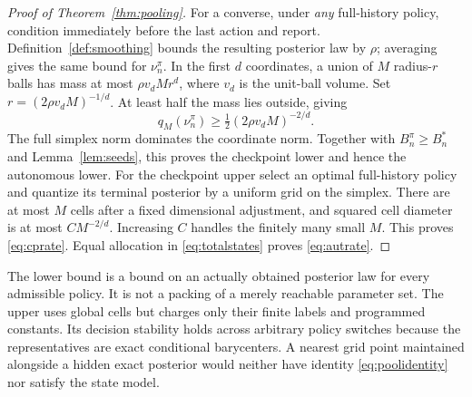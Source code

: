 \begin{proof}[Proof of Theorem~\ref{thm:pooling}]
For a converse, under \emph{any} full-history policy, condition immediately before the last action and report. Definition~\ref{def:smoothing} bounds the resulting posterior law by $\rho$; averaging gives the same bound for $\nu_n^\pi$. In the first $d$ coordinates, a union of $M$ radius-$r$ balls has mass at most $\rho v_dMr^d$, where $v_d$ is the unit-ball volume. Set $r=(2\rho v_dM)^{-1/d}$. At least half the mass lies outside, giving
\begin{equation}\label{eq:smallballlower}
 q_M(\nu_n^\pi)\ge\tfrac12(2\rho v_dM)^{-2/d}.
\end{equation}
The full simplex norm dominates the coordinate norm. Together with $B_n^\pi\ge B_n^*$ and Lemma~\ref{lem:seeds}, this proves the checkpoint lower and hence the autonomous lower. For the checkpoint upper select an optimal full-history policy and quantize its terminal posterior by a uniform grid on the simplex. There are at most $M$ cells after a fixed dimensional adjustment, and squared cell diameter is at most $CM^{-2/d}$. Increasing $C$ handles the finitely many small $M$. This proves \eqref{eq:cprate}. Equal allocation in \eqref{eq:totalstates} proves \eqref{eq:autrate}.
\end{proof}

The lower bound is a bound on an actually obtained posterior law for every admissible policy. It is not a packing of a merely reachable parameter set. The upper uses global cells but charges only their finite labels and programmed constants. Its decision stability holds across arbitrary policy switches because the representatives are exact conditional barycenters. A nearest grid point maintained alongside a hidden exact posterior would neither have identity \eqref{eq:poolidentity} nor satisfy the state model.
